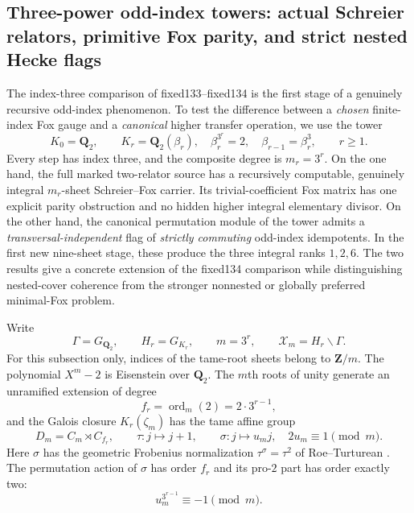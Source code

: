 
\subsection{Three-power odd-index towers: actual Schreier relators,
primitive Fox parity, and strict nested Hecke flags}
\label{subsec:dyadic-f135-3power-tower}

The index-three comparison of fixed133--fixed134
is the first stage of a genuinely recursive
odd-index phenomenon.  To test the difference
between a \emph{chosen} finite-index Fox gauge
and a \emph{canonical} higher transfer operation,
we use the tower
\[
K_0=\mathbf Q_2,\qquad
K_r=\mathbf Q_2(\beta_r),\quad
\beta_r^{3^r}=2,\quad
\beta_{r-1}=\beta_r^3,\qquad r\ge1.
\]
Every step has index three,
and the composite degree is
$m_r=3^r$.
On the one hand, the full marked
two-relator source has a recursively
computable, genuinely integral
$m_r$-sheet Schreier--Fox carrier.
Its trivial-coefficient Fox matrix
has one explicit parity obstruction
and no hidden higher integral
elementary divisor.
On the other hand, the canonical
permutation module of the tower
admits a \emph{transversal-independent}
flag of \emph{strictly commuting}
odd-index idempotents.
In the first new nine-sheet stage,
these produce the three integral
ranks $1,2,6$.
The two results give a
concrete extension of the
fixed134 comparison while
distinguishing nested-cover
coherence from the stronger
nonnested or globally preferred
minimal-Fox problem.

Write
\[
\Gamma=G_{\mathbf Q_2},\qquad
H_r=G_{K_r},\qquad
m=3^r,\qquad
\mathscr X_m=H_r\backslash\Gamma .
\]
For this subsection only,
indices of the tame-root sheets
belong to $\mathbf Z/m$.
The polynomial $X^m-2$
is Eisenstein over $\mathbf Q_2$.
The $m$th roots of unity generate
an unramified extension of
degree
\[
f_r=\operatorname{ord}_{m}(2)
=2\cdot3^{r-1},
\]
and the Galois closure
$K_r(\zeta_m)$ has
the tame affine group
\begin{equation}\label{eq:dyadic-f135-tame-affine-group}
\boxed{\quad
D_m=C_m\rtimes C_{f_r},\qquad
\tau:j\longmapsto j+1,\qquad
\sigma:j\longmapsto u_mj,\quad
2u_m\equiv1\pmod m.
\quad}
\end{equation}
Here $\sigma$ has the geometric
Frobenius normalization
$\tau^\sigma=\tau^2$ of
Roe--Turturean
\cite{RoeTurtureanGQ2}.
The permutation action
of $\sigma$ has order
$f_r$ and its pro-$2$
part has order exactly
two:
\begin{equation}\label{eq:dyadic-f135-tame-involution}
\boxed{\qquad
u_m^{3^{r-1}}\equiv-1\pmod m.
\qquad}
\end{equation}

